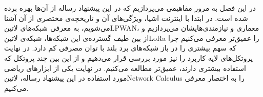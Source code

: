 
در این فصل به مرور مفاهیمی می‌پردازیم که در این پیشنهاد رساله از آن‌ها بهره برده شده است. در ابتدا با اینترنت اشیا، ویژگی‌های آن و تاریخچه‌ی مختصری از آن آشنا می‌شویم،
به معرفی شبکه‌های ‌لاتین{LPWAN}، معماری و نیازمندی‌هایشان
می‌پردازیم و از بین طیف گسترده‌ی این شبکه‌ها، شبکه‌ی ‌لاتین{LoRa} را عمیق‌تر
معرفی می‌کنیم چرا که سهم بیشتری را در باز شبکه‌های برد بلند با توان مصرفی کم دارد.
در نهایت پروتکل‌های لایه کاربرد را نیز مورد بررسی قرار می‌دهیم و از این بین چند پروتکل که استفاده بیشتری دارند، عمیق‌تر مطالعه می‌کنیم.
در نهایت یکی از ابزارهای ریاضی مورد استفاده در این پیشنهاد رساله، ‌لاتین{Network Calculus} را به اختصار معرفی می‌کنیم.






